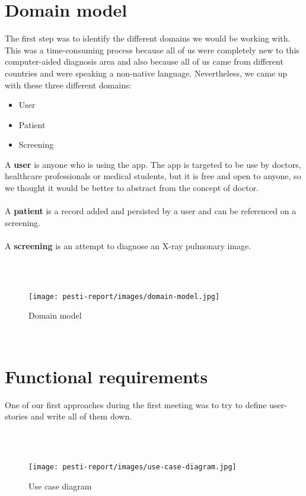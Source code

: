 \section{Domain model}

The first step was to identify the different domains we would be working with. This was a time-consuming process because all of us were completely new to this computer-aided diagnosis area and also because all of us came from different countries and were speaking a non-native language. Nevertheless, we came up with these three different domains:

\begin{itemize}
\item
User
\item
Patient
\item
Screening
\end{itemize}

A \textbf{user} is anyone who is using the app. The app is targeted to be use by doctors, healthcare professionals or medical students, but it is free and open to anyone, so we thought it would be better to abstract from the concept of doctor.
\\ \\
A \textbf{patient} is a record added and persisted by a user and can be referenced on a screening.
\\ \\
A \textbf{screening} is an attempt to diagnose an X-ray pulmonary image.


\\ \\
\begin{figure}[!h]
	\centering
	\texttt{[image: pesti-report/images/domain-model.jpg]}
	\caption{Domain model}
	\label{fig:domain-model}
\end{figure}
\\


\section{Functional requirements}

One of our first approaches during the first meeting was to try to define user-stories and write all of them down.

\\ \\
\begin{figure}[!h]
	\centering
	\texttt{[image: pesti-report/images/use-case-diagram.jpg]}
	\caption{Use case diagram}
	\label{fig:use-case-diagram}
\end{figure}

